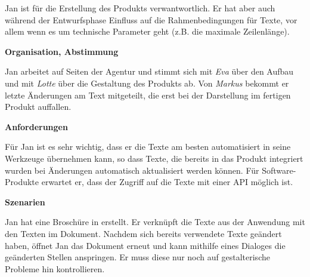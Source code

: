 \begin{multicols}{2}

\begin{center}
\end{center}


Jan ist für die Erstellung des Produkts verwantwortlich. Er hat aber auch während der Entwurfsphase Einfluss auf die Rahmenbedingungen für Texte, vor allem wenn es um technische Parameter geht (z.B. die maximale Zeilenlänge).

\textbf{Organisation, Abstimmung}

Jan arbeitet auf Seiten der Agentur und stimmt sich mit \emph{Eva} über den Aufbau und mit \emph{Lotte} über die Gestaltung des Produkts ab. Von \emph{Markus} bekommt er letzte Änderungen am Text mitgeteilt, die erst bei der Darstellung im fertigen Produkt auffallen.

\textbf{Anforderungen}

Für Jan ist es sehr wichtig, dass er die Texte am besten automatisiert in seine Werkzeuge übernehmen kann, so dass Texte, die bereits in das Produkt integriert wurden bei Änderungen automatisch aktualisiert werden können. Für Software-Produkte erwartet er, dass der Zugriff auf die Texte mit einer API möglich ist.

\columnbreak

\textbf{Szenarien}

Jan hat eine Broschüre in  erstellt. Er verknüpft die Texte aus der Anwendung mit den Texten im Dokument. Nachdem sich bereits verwendete Texte geändert haben, öffnet Jan das Dokument erneut und kann mithilfe eines Dialoges die geänderten Stellen anspringen. Er muss diese nur noch auf gestalterische Probleme hin kontrollieren.


\end{multicols}
